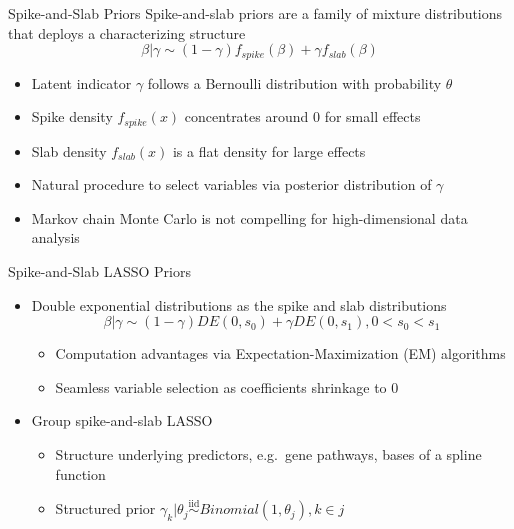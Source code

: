 \documentclass[
  ignorenonframetext,
  aspectratio=169]{beamer}
\providecommand{\tightlist}{%
  \setlength{\itemsep}{0pt}\setlength{\parskip}{0pt}}
\newcommand{\simiid}{\overset{\text{iid}}{\sim}}
\begin{document}
\begin{frame}{Spike-and-Slab Priors}
\protect\hypertarget{spike-and-slab-priors}{}
Spike-and-slab priors are a family of mixture distributions that deploys
a characterizing structure
\[\beta|\gamma \sim (1-\gamma)f_{spike}(\beta) + \gamma f_{slab}(\beta)\]

\begin{itemize}
\item
  Latent indicator \(\gamma\) follows a Bernoulli distribution with
  probability \(\theta\)
\item
  Spike density \(f_{spike}(x)\) concentrates around 0 for small effects
\item
  Slab density \(f_{slab}(x)\) is a flat density for large effects
\item
  Natural procedure to select variables via posterior distribution of
  \(\gamma\)
\item
  Markov chain Monte Carlo is not compelling for high-dimensional data
  analysis
\end{itemize}
\end{frame}

\begin{frame}{Spike-and-Slab LASSO Priors}
\protect\hypertarget{spike-and-slab-lasso-priors}{}
\begin{itemize}
\tightlist
\item
  Double exponential distributions as the spike and slab distributions
  \[\beta|\gamma \sim (1-\gamma)DE(0, s_0) + \gamma DE(0, s_1), 0 < s_0 < s_1\]

  \begin{itemize}
  \tightlist
  \item
    Computation advantages via Expectation-Maximization (EM) algorithms
  \item
    Seamless variable selection as coefficients shrinkage to 0
  \end{itemize}
\item
  Group spike-and-slab LASSO

  \begin{itemize}
  \tightlist
  \item
    Structure underlying predictors, e.g.~gene pathways, bases of a
    spline function
  \item
    Structured prior
    \(\gamma_k | \theta_j \simiid Binomial(1, \theta_j), k \in j\)
  \end{itemize}
\end{itemize}
\end{frame}
\end{document}
